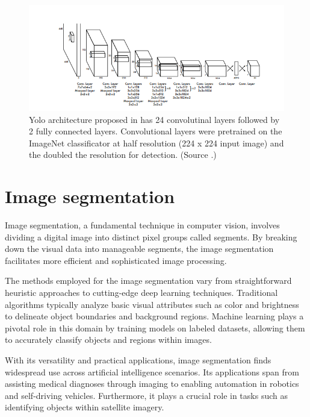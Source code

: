\begin{figure}
  \centering
  \includegraphics[width=\linewidth]{text/chapter_03/imgs/YOLO_architecture}
  \caption{Yolo architecture proposed in \cite{YOLORedmon2016} has 24 convolutinal layers followed by 2 fully connected layers. Convolutional layers were pretrained on the ImageNet classificator at half resolution (224 x 224 input image) and the doubled the resolution for detection. (Source \cite{YOLORedmon2016}.)}
  \label{fig:yoloArchitecture}
\end{figure}


\section{Image segmentation}
Image segmentation, a fundamental technique in computer vision, involves dividing \linebreak a digital image into distinct pixel groups called segments. By breaking down the visual data into manageable segments, the image segmentation facilitates more efficient and sophisticated image processing.

The methods employed for the image segmentation vary from straightforward heuristic approaches to cutting-edge deep learning techniques. Traditional algorithms typically analyze basic visual attributes such as color and brightness to delineate object boundaries and background regions. Machine learning plays a pivotal role in this domain by training models on labeled datasets, allowing them to accurately classify objects and regions within images.

With its versatility and practical applications, image segmentation finds widespread use across artificial intelligence scenarios. Its applications span from assisting medical diagnoses through imaging to enabling automation in robotics and self-driving vehicles. Furthermore, it plays a crucial role in tasks such as identifying objects within satellite imagery.

